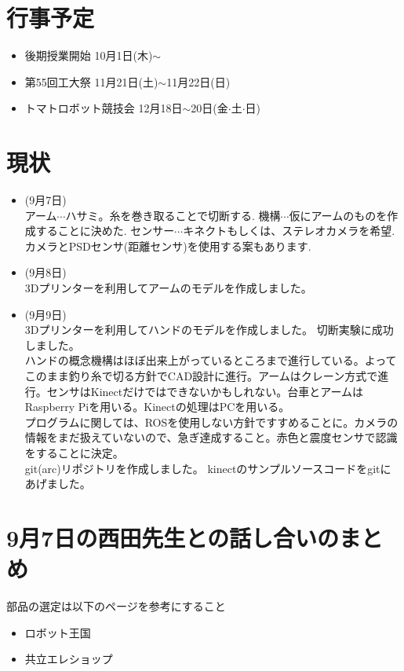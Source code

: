 \section{行事予定}
\begin{itemize}
\item 後期授業開始
10月1日(木)$\sim$
\item 第55回工大祭
11月21日(土)$\sim$11月22日(日)
\item トマトロボット競技会
12月18日$\sim$20日(金$\cdot$土$\cdot$日)
\end{itemize}

\section{現状}
\begin{itemize}
\item (9月7日)\\
アーム$\cdots$ハサミ。糸を巻き取ることで切断する.
機構$\cdots$仮にアームのものを作成することに決めた.
センサー$\cdots$キネクトもしくは、ステレオカメラを希望.
カメラとPSDセンサ(距離センサ)を使用する案もあります.
\item (9月8日)\\
3Dプリンターを利用してアームのモデルを作成しました。
\item (9月9日)\\
3Dプリンターを利用してハンドのモデルを作成しました。
切断実験に成功しました。\\
ハンドの概念機構はほぼ出来上がっているところまで進行している。よってこのまま釣り糸で切る方針でCAD設計に進行。アームはクレーン方式で進行。センサはKinectだけではできないかもしれない。台車とアームはRaspberry Piを用いる。Kinectの処理はPCを用いる。\\
プログラムに関しては、ROSを使用しない方針ですすめることに。カメラの情報をまだ扱えていないので、急ぎ達成すること。赤色と震度センサで認識をすることに決定。\\
git(arc)リポジトリを作成しました。
kinectのサンプルソースコードをgitにあげました。
\end{itemize}

\section{9月7日の西田先生との話し合いのまとめ}
部品の選定は以下のページを参考にすること
\begin{itemize}
\item ロボット王国
\item 共立エレショップ
\end{itemize}

